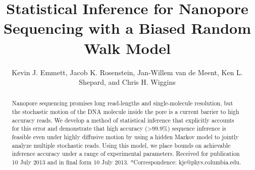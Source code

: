 \documentclass{biophys_letter}
\title{Statistical Inference for Nanopore Sequencing with a Biased Random Walk Model}
\author{Kevin J. Emmett,{\authdag *} Jacob K. Rosenstein,{\authpar} Jan-Willem van de Meent,{\authddag} Ken L. Shepard,{\addrS} and Chris H. Wiggins{\authddag}}
\begin{document}
\setcounter{page}{1} %

\pagestyle{headings}

\maketitle


\begin{abstract}
{Nanopore sequencing promises long read-lengths and single-molecule resolution, but the stochastic motion of the DNA molecule inside the pore is a current barrier to high accuracy reads.
We develop a method of statistical inference that explicitly accounts for this error and demonstrate that high accuracy (\textgreater 99.9\%) sequence inference is feasible even under highly diffusive motion by using a hidden Markov model to jointly analyze multiple stochastic reads.
Using this model, we place bounds on achievable inference accuracy under a range of experimental parameters.}
{Received for publication 10 July 2013 and in final form 10 July 2013.}
{*Correspondence: kje@phys.columbia.edu.}
\end{abstract}
\end{document}
